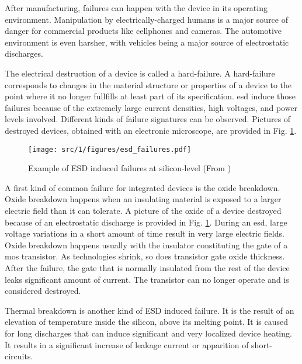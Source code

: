 After manufacturing, failures can happen with the device in its operating environment.
Manipulation by electrically-charged humans is a major source of danger for commercial products like cellphones and cameras.
The automotive environment is even harsher, with vehicles being a major source of electrostatic discharges.

The electrical destruction of a device is called a hard-failure.
A hard-failure corresponds to changes in the material structure or properties of a device to the point where it no longer fullfills at least part of its specification.
\gls{esd} induce those failures because of the extremely large current densities, high voltages, and power levels involved.
Different kinds of failure signatures can be observed.
Pictures of destroyed devices, obtained with an electronic microscope, are provided in Fig. \ref{fig:silicon-level-failures}.

\begin{figure}[!h]
  \centering
  \texttt{[image: src/1/figures/esd\_failures.pdf]}
  \caption{Example of ESD induced failures at silicon-level (From \cite{esd-robust-product})}
  \label{fig:silicon-level-failures}
\end{figure}


A first kind of common failure for integrated devices is the oxide breakdown.
Oxide breakdown happens when an insulating material is exposed to a larger electric field than it can tolerate.
A picture of the oxide of a device destroyed because of an electrostatic discharge is provided in Fig. \ref{fig:silicon-level-failures}.
During an \gls{esd}, large voltage variations in a short amount of time result in very large electric fields.
Oxide breakdown happens usually with the insulator constituting the gate of a \gls{mos} transistor.
As technologies shrink, so does transistor gate oxide thickness.
After the failure, the gate that is normally insulated from the rest of the device leaks significant amount of current.
The transistor can no longer operate and is considered destroyed.

Thermal breakdown is another kind of ESD induced failure.
It is the result of an elevation of temperature inside the silicon, above its melting point.
It is caused for long discharges that can induce significant and very localized device heating.
It results in a significant increase of leakage current or apparition of short-circuits.

